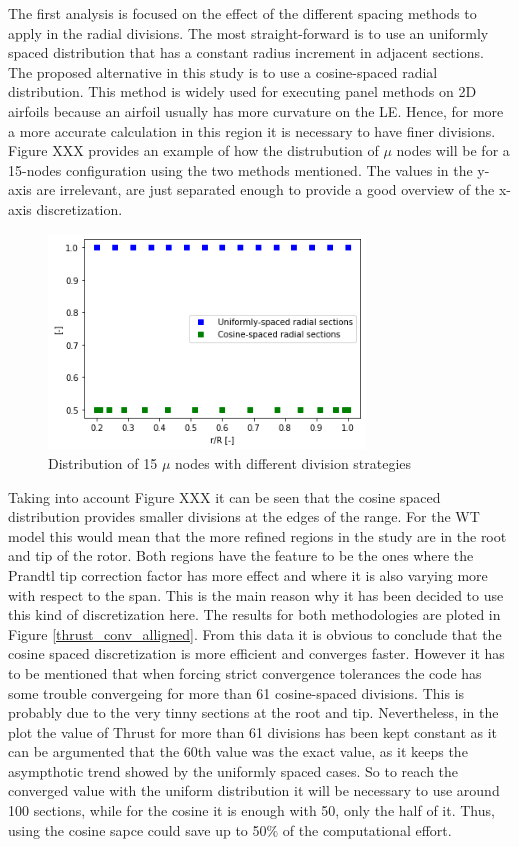 The first analysis is focused on the effect of the different spacing methods to apply in the radial divisions. The most straight-forward is to use an uniformly spaced distribution that has a constant radius increment in adjacent sections. The proposed alternative in this study is to use a cosine-spaced radial distribution. This method is widely used for executing panel methods on 2D airfoils because an airfoil usually has more curvature on the LE. Hence, for more a more accurate calculation in this region it is necessary to have finer divisions. Figure XXX provides an example of how the distrubution of $\mu$ nodes will be for a 15-nodes configuration using the two methods mentioned. The values in the y-axis are irrelevant, are just separated enough to provide a good overview of the x-axis discretization. 

\begin{figure}[htbp]
\includegraphics[width=0.75\textwidth]{./img/ex_cos_plt.png}
\caption{Distribution of 15 $\mu$ nodes with different division strategies }
\centering
\label{mu_nodes}
\end{figure}

Taking into account Figure XXX it can be seen that the cosine spaced distribution provides smaller divisions at the edges of the range. For the WT model this would mean that the more refined regions in the study are in the root and tip of the rotor. Both regions have the feature to be the ones where the Prandtl tip correction factor has more effect and where it is also varying more with respect to the span. This is the main reason why it has been decided to use this kind of discretization here. The results for both methodologies are ploted in Figure \ref{thrust_conv_alligned}. From this data it is obvious to conclude that the cosine spaced discretization is more efficient and converges faster. However it has to be mentioned that when forcing strict convergence tolerances the code has some trouble convergeing for more than 61 cosine-spaced divisions. This is probably due to the very tinny sections at the root and tip. Nevertheless, in the plot the value of Thrust for more than 61 divisions has been kept constant as it can be argumented that the 60th value was the exact value, as it keeps the asympthotic trend showed by the uniformly spaced cases. So to reach the converged value with the uniform distribution it will be necessary to use around 100 sections, while for the cosine it is enough with 50, only the half of it. Thus, using the cosine sapce could save up to 50$\%$ of the computational effort. 

